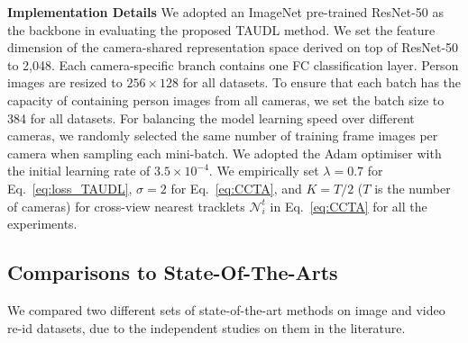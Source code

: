 \documentclass[runningheads]{llncs}
\begin{document}
\noindent \textbf{Implementation Details }
We adopted an ImageNet pre-trained ResNet-50 \cite{he2016deep} as the backbone
in evaluating the proposed TAUDL method.
We set the feature dimension of the camera-shared representation space derived on top of ResNet-50
to 2,048.
Each camera-specific branch contains one FC classification layer.
Person images are resized to $256\! \times \! 128$ for all datasets.
To ensure that each batch has the capacity of containing person images from all cameras, 
we set the batch size to 384 for all datasets.
For balancing the model learning speed over different cameras,
we randomly selected the same number of training frame images
per camera when sampling each mini-batch. 
We adopted the Adam optimiser \cite{kingma2014adam} with the initial learning rate of $3.5 \!\times\! 10^{-4}$. 
We empirically set $\lambda\!=\!0.7$ for Eq.~\eqref{eq:loss_TAUDL},
$\sigma\!=\!2$ for Eq.~\eqref{eq:CCTA}, and $K\!=\!T/2$ ($T$ is the number of cameras) for cross-view nearest tracklets $\mathcal{N}_i^t$ in Eq.~\eqref{eq:CCTA} for all the experiments.


\subsection{Comparisons to State-Of-The-Arts}

We compared two different sets of state-of-the-art methods
on image and video re-id datasets, due to the independent studies on them 
in the literature.
\end{document}

